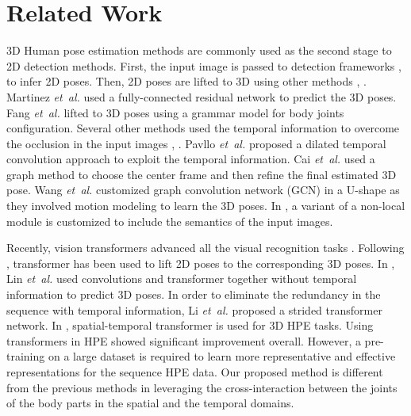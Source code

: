 \documentclass[runningheads]{llncs}
\newcommand{\latinphrase}[1]{\textit{#1}}
\newcommand{\etal}{\latinphrase{et~al.}\xspace}
\begin{document}
\section{Related Work}
3D Human pose estimation methods are commonly used as the second stage to 2D detection methods. First, the input image is passed to detection frameworks \cite{he2017mask}, \cite{cpn} to infer 2D poses. Then, 2D poses are lifted to 3D using other methods \cite{poseformer}, \cite{pavllo20193d}. Martinez \etal \cite{martinez2017simple} used a fully-connected residual network to predict the 3D poses. Fang \etal \cite{fang2018learning} lifted to 3D poses using a grammar model for body joints configuration. Several other methods used  the temporal information to overcome the occlusion in the input images \cite{li2021exploiting}, \cite{pavllo20193d}. Pavllo \etal \cite{pavllo20193d} proposed a dilated temporal convolution approach to exploit the temporal information. Cai \etal \cite{cai2019exploiting} used a graph method to choose the center frame and then refine the final estimated 3D pose. Wang \etal \cite{wang2020motion} customized graph convolution network (GCN) in a U-shape as they involved motion modeling to learn the 3D poses. In \cite{zhao2019semantic}, a variant of a non-local module is customized to include the semantics of the input images.

Recently, vision transformers advanced all the visual recognition tasks \cite{transformers}. Following \cite{dosovitskiy2020image}, transformer has been used to lift 2D poses to the corresponding 3D poses. In \cite{lin2021end}, Lin \etal used convolutions and transformer together without temporal information to predict 3D poses. In order to eliminate the redundancy in the sequence with temporal information, Li \etal \cite{li2021exploiting} proposed a strided transformer network. In \cite{poseformer}, spatial-temporal transformer is used for 3D HPE tasks. Using transformers in HPE showed significant improvement overall. However, a pre-training on a large dataset is required to learn more representative and effective representations for the sequence HPE data. Our proposed method is different from the previous methods in leveraging the cross-interaction between the joints of the body parts in the spatial and the temporal domains. 
\end{document}
